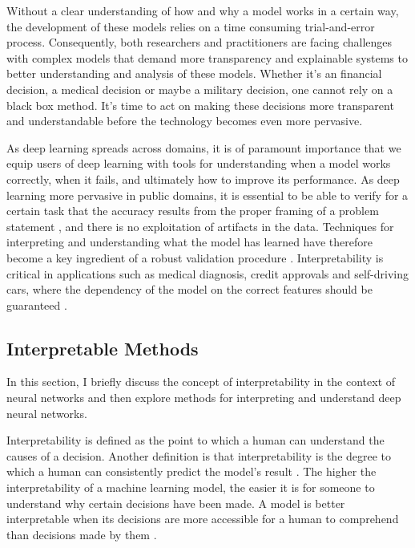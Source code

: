 Without a clear understanding of how and why a model works in a certain way, the development of these models relies on a time consuming trial-and-error process. Consequently, both researchers and practitioners are facing challenges with complex models that demand more transparency and explainable systems to better understanding and analysis of these models. Whether it's an financial decision, a medical decision or maybe a military decision, one cannot rely on a black box method. It's time to act on making these decisions more transparent and understandable before the technology becomes even more pervasive.

As deep learning spreads across domains, it is of paramount importance that we equip users of deep learning with tools for understanding when a model works correctly, when it fails, and ultimately how to improve its performance. As deep learning more pervasive in public domains, it is essential to be able to verify for a certain task that the accuracy results from the proper framing of a problem statement \cite{Liu2017}, and there is no exploitation of artifacts in the data. Techniques for interpreting and understanding what the model has learned have therefore become a key ingredient of a robust validation procedure \cite{taylor2006methods} \cite{hansen2011visual} \cite{bach2015pixel}. Interpretability is critical in applications such as medical diagnosis, credit approvals and self-driving cars, where the dependency of the model on the correct features should be guaranteed \cite{Caruana:2015:IMH:2783258.2788613} \cite{bojarski2017explaining}.

\subsection{Interpretable Methods}

In this section, I briefly discuss the concept of interpretability in the context of neural networks and then explore methods for interpreting and understand deep neural networks.

Interpretability is defined as the point to which a human can understand the causes of a decision. Another definition is that interpretability is the degree to which a human can consistently predict the model’s result \cite{molnar}. The higher the interpretability of a machine learning model, the easier it is for someone to understand why certain decisions have been made. A model is better interpretable when its decisions are more accessible for a human to comprehend than decisions made by them \cite{molnar}.


